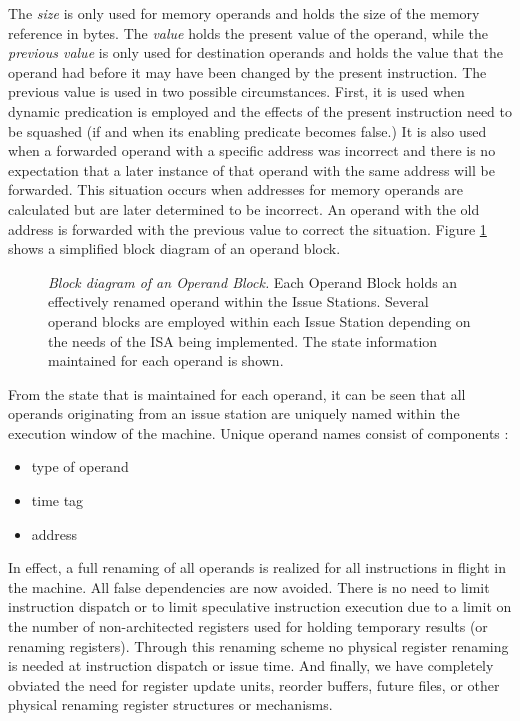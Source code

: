 \documentclass[10pt,dvips]{article}
\begin{document}
The \textit{size} is only used for memory operands and holds
the size of the memory reference in bytes.
The \textit{value} holds the present value of the operand,
while the \textit{previous value} is only used for destination
operands and holds the value that the operand
had before it may have been changed by the present instruction.
The previous value is used in two possible circumstances.
First, it is used when dynamic predication is
employed and the effects of the present instruction need to be
squashed (if and when its enabling predicate becomes false.)
It is also used when a forwarded operand with a specific
address was incorrect 
and there is no expectation that a later instance
of that operand with the same address will be forwarded.
This situation occurs when addresses for memory operands are
calculated but are later determined to be incorrect.
An operand with the old address is forwarded with the previous
value to correct the situation.
Figure \ref{fig:operand} shows a simplified block diagram of
an operand block.
%
\begin{figure}
\centering
\scriptsize {
}
\caption{{\em Block diagram of an Operand Block.} 
Each Operand Block holds an effectively renamed 
operand within the Issue Stations.
Several operand blocks are employed within each Issue Station
depending on the needs of the ISA being implemented.
The state information maintained for each operand
is shown.}
\label{fig:operand}
\end{figure}
%

From the state that is maintained for each operand, it can be seen
that all operands originating from an issue station
are uniquely named within the
execution window of the machine.
Unique operand names consist of components :
%
\begin{itemize}
\vspace{-0.10in}
\item{type of operand}
\vspace{-0.10in}
\item{time tag}
\vspace{-0.10in}
\item{address}
\vspace{-0.10in}
\end{itemize}   
%
In effect, a full renaming of
all operands is realized for all instructions
in flight in the machine.  
All false dependencies are now avoided.
There is no need to limit instruction dispatch or to limit speculative
instruction execution due to a limit on the number of non-architected
registers used for holding temporary results (or renaming registers).
Through this renaming scheme
no physical register renaming is needed at instruction dispatch
or issue time.  
And finally, we have completely obviated the need for
register update units, reorder buffers, future files, or other physical 
renaming register structures or mechanisms.
%
%
\end{document}
